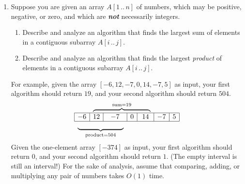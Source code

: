 \begin{enumerate}[label=\arabic*.,ref=\thechapter.\arabic*,leftmargin=*,align=left,widest*=99,itemsep=1.5ex plus 0.5ex]
\item Suppose you are given an array $A[1\,..\,n]$ of numbers, which may be positive, negative, or zero, and which are \textbf{\textit{not}} necessarily integers.
\begin{enumerate}
\item Describe and analyze an algorithm that finds the largest sum of elements in a contiguous subarray $A[i\,..\,j]$.
\item Describe and analyze an algorithm that finds the largest \textit{product} of elements in a contiguous subarray $A[i\,..\,j]$.
\end{enumerate}
For example, given the array $[-6, 12, -7, 0, 14, -7, 5]$ as input, your first algorithm should return $19$, and your second algorithm should return $504$.
\[
\begin{array}{|c|c|c|c|c|c|c|}
\multicolumn{1}{c}{} & \multicolumn{4}{c}{\overbrace{\hspace{85pt}}^{\text{sum}=19}} & \multicolumn{2}{c}{}\\[-0.7ex]
\hline
-6 & 12 & -7 & 0 & 14 & -7 & 5\\
\hline
\multicolumn{3}{c}{\underbrace{\hspace{68pt}}_{\text{product}=504}} & \multicolumn{4}{c}{}
\end{array}
\]
Given the one-element array $[-374]$ as input, your first algorithm should return $0$, and your second algorithm should return $1$.
(The empty interval is still an interval!)
For the sake of analysis, assume that comparing, adding, or multiplying any pair of numbers takes $O(1)$ time.



\end{enumerate}
